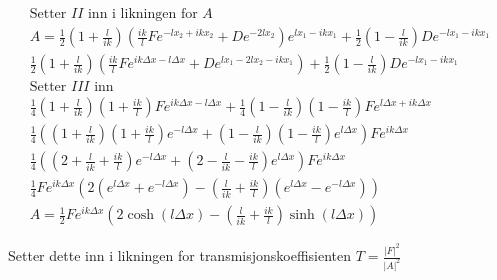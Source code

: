 \documentclass[11pt, A4paper,norsk]{article}
\begin{document}
				\begin{gather*}
\text{Setter $II$ inn i likningen for $A$} \\
A = \frac{1}{2} \left( 1 + \frac{l}{ik} \right) \left( \frac{i k}{l} F e^{- l x_2 + i k x_2} + D e^{- 2 l x_2} \right) e^{l x_1 - i k x_1} + \frac{1}{2} \left( 1 - \frac{l}{ik} \right) D e^{- l x_1 - i k x_1} \\
\frac{1}{2} \left( 1 + \frac{l}{ik} \right) \left( \frac{i k}{l} F e^{i k \Delta x - l \Delta x} + D e^{l x_1 - 2 l x_2 - i k x_1} \right) + \frac{1}{2} \left( 1 - \frac{l}{ik} \right) D e^{- l x_1 - i k x_1} \\
\text{Setter $III$ inn} \\
\frac{1}{4} \left( 1 + \frac{l}{ik} \right) \left( 1 + \frac{i k}{l} \right) F e^{i k \Delta x - l \Delta x} + \frac{1}{4} \left( 1 - \frac{l}{ik} \right) \left( 1 - \frac{i k}{l} \right) F e^{l \Delta x + i k \Delta x} \\
\frac{1}{4} \left( \left( 1 + \frac{l}{ik} \right) \left( 1 + \frac{i k}{l} \right) e^{- l \Delta x} + \left( 1 - \frac{l}{ik} \right) \left( 1 - \frac{i k}{l} \right) e^{l \Delta x} \right) F e^{i k \Delta x} \\
\frac{1}{4} \left( \left( 2 + \frac{l}{i k} + \frac{i k}{l} \right) e^{- l \Delta x} + \left( 2 - \frac{l}{i k} - \frac{i k}{l} \right) e^{l \Delta x} \right) F e^{i k \Delta x} \\
\frac{1}{4} F e^{i k \Delta x} \left( 2 \left( e^{l \Delta x} + e^{- l \Delta x} \right) - \left( \frac{l}{i k} + \frac{i k}{l} \right) \left( e^{l \Delta x} - e^{- l \Delta x} \right) \right) \\
A = \frac{1}{2} F e^{i k \Delta x} \left( 2 \cosh \left( l \Delta x \right) - \left( \frac{l}{i k} + \frac{i k}{l} \right) \sinh \left( l \Delta x \right) \right)
				\end{gather*}
				\begin{flushleft}
Setter dette inn i likningen for transmisjonskoeffisienten $T = \frac{|F|^2}{|A|^2}$
				\end{flushleft}
\end{document}
